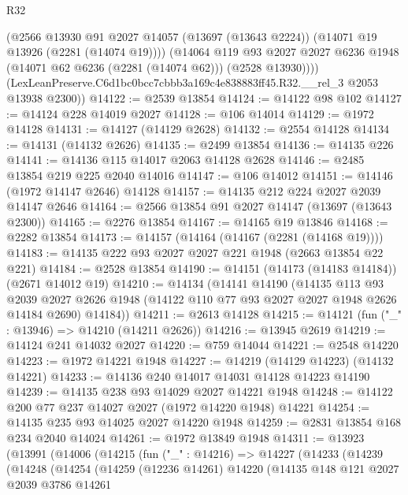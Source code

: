 \begin{lexlean}{R32}
\begin{coremodule}
          (@2566
            @13930
            @91
            @2027
            @14057
            (@13697 (@13643 @2224))
            (@14071 @19 @13926 (@2281 (@14074 @19))))
          (@14064
            @119
            @93
            @2027
            @2027
            @6236
            @1948
            (@14071 @62 @6236 (@2281 (@14074 @62)))
            (@2528 @13930))))
      (LexLeanPreserve.C6d1bc0bcc7cbbb3a169c4e838883ff45.R32.__rel_3 @2053 @13938 @2300))
@14122 := @2539 @13854
@14124 := @14122 @98 @102
@14127 := @14124 @228 @14019 @2027
@14128 := @106 @14014
@14129 := @1972 @14128
@14131 := @14127 (@14129 @2628)
@14132 := @2554 @14128
@14134 := @14131 (@14132 @2626)
@14135 := @2499 @13854
@14136 := @14135 @226
@14141 := @14136 @115 @14017 @2063 @14128 @2628
@14146 := @2485 @13854 @219 @225 @2040 @14016
@14147 := @106 @14012
@14151 := @14146 (@1972 @14147 @2646) @14128
@14157 := @14135 @212 @224 @2027 @2039 @14147 @2646
@14164 := @2566 @13854 @91 @2027 @14147 (@13697 (@13643 @2300))
@14165 := @2276 @13854
@14167 := @14165 @19 @13846
@14168 := @2282 @13854
@14173 := @14157 (@14164 (@14167 (@2281 (@14168 @19))))
@14183 := @14135 @222 @93 @2027 @2027 @221 @1948 (@2663 @13854 @22 @221)
@14184 := @2528 @13854
@14190 := @14151 (@14173 (@14183 @14184)) (@2671 @14012 @19)
@14210 := @14134
    (@14141
      @14190
      (@14135
        @113
        @93
        @2039
        @2027
        @2626
        @1948
        (@14122 @110 @77 @93 @2027 @2027 @1948 @2626 @14184 @2690)
        @14184))
@14211 := @2613 @14128
@14215 := @14121 (fun ("_" : @13946) => @14210 (@14211 @2626))
@14216 := @13945 @2619
@14219 := @14124 @241 @14032 @2027
@14220 := @759 @14044
@14221 := @2548 @14220
@14223 := @1972 @14221 @1948
@14227 := @14219 (@14129 @14223) (@14132 @14221)
@14233 := @14136 @240 @14017 @14031 @14128 @14223 @14190
@14239 := @14135 @238 @93 @14029 @2027 @14221 @1948
@14248 := @14122 @200 @77 @237 @14027 @2027 (@1972 @14220 @1948) @14221
@14254 := @14135 @235 @93 @14025 @2027 @14220 @1948
@14259 := @2831 @13854 @168 @234 @2040 @14024
@14261 := @1972 @13849 @1948
@14311 := @13923
    (@13991
      (@14006
        (@14215
          (fun ("_" : @14216) =>
          @14227
            (@14233
              (@14239
                (@14248
                  (@14254
                    (@14259
                      (@12236 @14261)
                      @14220
                      (@14135
                        @148
                        @121
                        @2027
                        @2039
                        @3786
                        @14261

\end{coremodule}
\end{lexlean}
